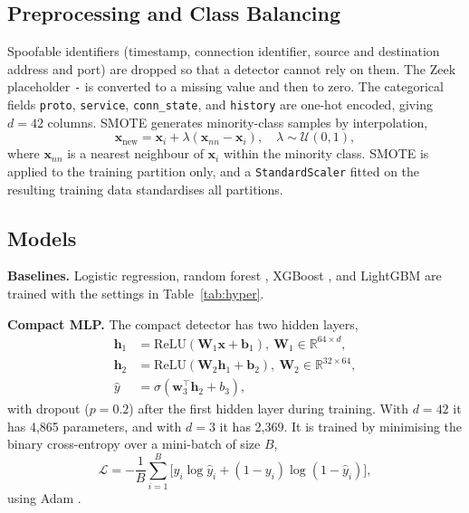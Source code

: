 \subsection{Preprocessing and Class Balancing}
Spoofable identifiers (timestamp, connection identifier, source and destination address and port) are dropped so that a detector cannot rely on them. The Zeek placeholder \texttt{-} is converted to a missing value and then to zero. The categorical fields \texttt{proto}, \texttt{service}, \texttt{conn\_state}, and \texttt{history} are one-hot encoded, giving $d=42$ columns. SMOTE \cite{chawla2002} generates minority-class samples by interpolation,
\begin{equation}
\mathbf{x}_{\text{new}}=\mathbf{x}_i+\lambda(\mathbf{x}_{nn}-\mathbf{x}_i),\quad \lambda\sim\mathcal{U}(0,1),
\end{equation}
where $\mathbf{x}_{nn}$ is a nearest neighbour of $\mathbf{x}_i$ within the minority class. SMOTE is applied to the training partition only, and a \texttt{StandardScaler} fitted on the resulting training data standardises all partitions.

\subsection{Models}
\textbf{Baselines.} Logistic regression, random forest \cite{breiman2001}, XGBoost \cite{chen2016}, and LightGBM \cite{ke2017} are trained with the settings in Table~\ref{tab:hyper}.

\textbf{Compact MLP.} The compact detector has two hidden layers,
\begin{align}
\mathbf{h}_1&=\mathrm{ReLU}(\mathbf{W}_1\mathbf{x}+\mathbf{b}_1),\ \mathbf{W}_1\in\mathbb{R}^{64\times d},\\
\mathbf{h}_2&=\mathrm{ReLU}(\mathbf{W}_2\mathbf{h}_1+\mathbf{b}_2),\ \mathbf{W}_2\in\mathbb{R}^{32\times 64},\\
\hat{y}&=\sigma(\mathbf{w}_3^{\top}\mathbf{h}_2+b_3),
\end{align}
with dropout ($p=0.2$) after the first hidden layer during training. With $d=42$ it has 4,865 parameters, and with $d=3$ it has 2,369. It is trained by minimising the binary cross-entropy over a mini-batch of size $B$,
\begin{equation}
\mathcal{L}=-\frac{1}{B}\sum_{i=1}^{B}\big[y_i\log\hat{y}_i+(1-y_i)\log(1-\hat{y}_i)\big],
\end{equation}
using Adam \cite{kingma2015}.

